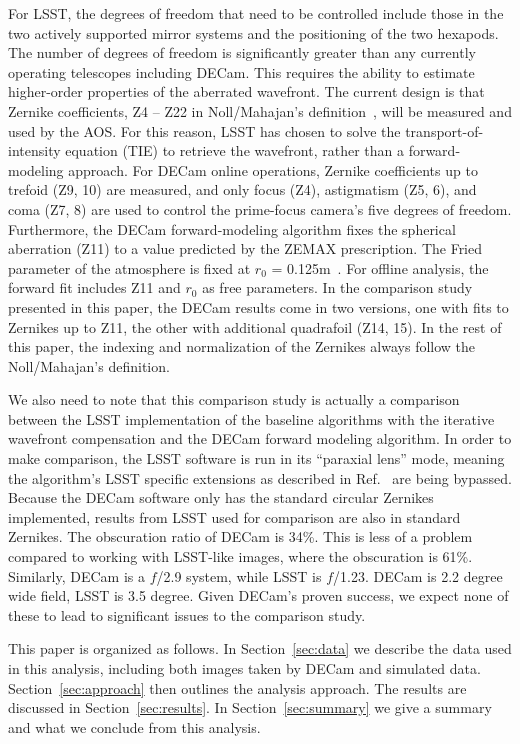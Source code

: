\documentclass[]{spie}  %
\begin{document}
For LSST, the degrees of freedom that need to be controlled include those in the two actively supported mirror systems and the positioning of the two hexapods.
The number of degrees of freedom is significantly greater than any currently operating telescopes including DECam.
This requires the ability to estimate higher-order properties of the aberrated wavefront.
The current design is that Zernike coefficients, Z4 -- Z22 
in Noll/Mahajan's definition~\cite{standardZ, annularZ}, will be measured and used by the AOS.
For this reason, LSST has chosen to solve the transport-of-intensity equation (TIE) to retrieve the wavefront, rather than a forward-modeling approach.
For DECam online operations, Zernike coefficients up to trefoid (Z9, 10) are measured, and only focus (Z4), astigmatism (Z5, 6), and coma (Z7, 8) are used to control the prime-focus camera's five degrees of freedom. 
Furthermore, the DECam forward-modeling algorithm fixes
the spherical aberration (Z11) to a value predicted by the ZEMAX prescription. 
The Fried parameter of the atmosphere is fixed at $r_0$ = 0.125m~\cite{roodman14}.
For offline analysis, the forward fit includes Z11 and $r_0$ as free parameters.
In the comparison study presented in this paper, the DECam results come in two versions, one with fits to Zernikes up to Z11, the other with additional quadrafoil (Z14, 15).
In the rest of this paper, the indexing and normalization of the Zernikes always follow
the Noll/Mahajan's definition.

We also need to note that this comparison study is actually a comparison between the LSST implementation of the baseline algorithms with the iterative wavefront compensation and the DECam forward modeling algorithm.
In order to make comparison, the LSST software is run in its ``paraxial lens'' mode, meaning the algorithm's LSST specific extensions as described in Ref.~ are being bypassed. 
Because the DECam software only has the standard circular Zernikes implemented, results from LSST used for comparison are also in standard Zernikes. The obscuration ratio of DECam is 34\%. This is less of a problem compared to working with LSST-like images, where the obscuration is 61\%. 
Similarly, DECam is a $f$/2.9 system, while LSST is $f$/1.23. DECam is 2.2 degree wide field, LSST is 3.5 degree.
Given DECam's proven success, we expect none of these to lead to significant issues to the comparison study.

This paper is organized as follows.
In Section~\ref{sec:data} we describe the data used in this analysis, including both images taken by DECam and simulated data.
Section~\ref{sec:approach} then outlines the analysis approach.
The results are discussed in Section~\ref{sec:results}.
In Section~\ref{sec:summary} we give a summary and what we conclude from this analysis.
\end{document}
